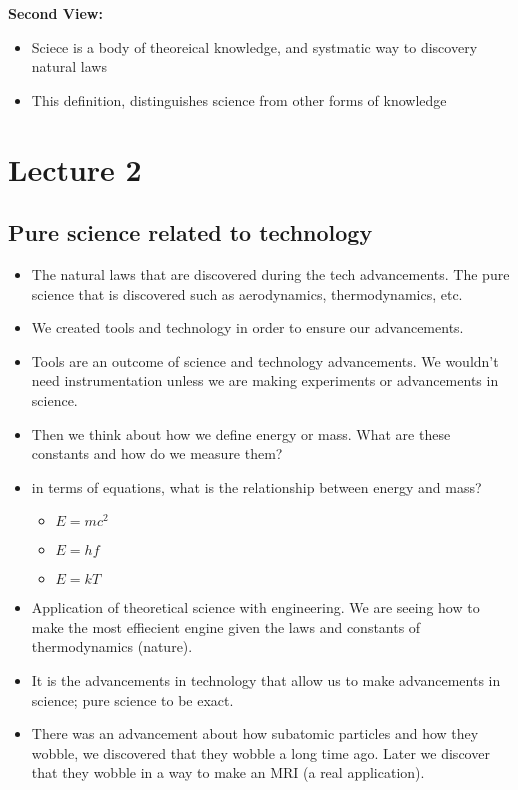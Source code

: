 \documentclass{article}
\begin{document}
\noindent \textbf{Second View:}
\begin{itemize}
  \item Sciece is a body of theoreical knowledge, and systmatic way to discovery natural laws
  \item This definition, distinguishes science from other forms of knowledge
\end{itemize}

\newpage
\section{Lecture 2}

\subsection{Pure science related to technology}
\begin{itemize}
  \item The natural laws that are discovered during the tech advancements.
    The pure science that is discovered such as aerodynamics, thermodynamics, etc.
  \item We created tools and technology in order to ensure our advancements.
  \item Tools are an outcome of science and technology advancements. We wouldn't
    need instrumentation unless we are making experiments or advancements in science.
  \item Then we think about how we define energy or mass. What are these constants and how
    do we measure them?
  \item in terms of equations, what is the relationship between energy and mass?
    \begin{itemize}
      \item $E = mc^2$
      \item $E = hf$
      \item $E = kT$
    \end{itemize}
  \item Application of theoretical science with engineering.
    We are seeing how to make the most effiecient engine
    given the laws and constants of thermodynamics (nature).
  \item It is the advancements in technology that allow us to
    make advancements in science; pure science to be exact.
  \item There was an advancement about how subatomic particles
    and how they wobble, we discovered that they wobble a long time ago.
    Later we discover that they wobble in a way to make an MRI (a real application).
\end{itemize}
\end{document}
